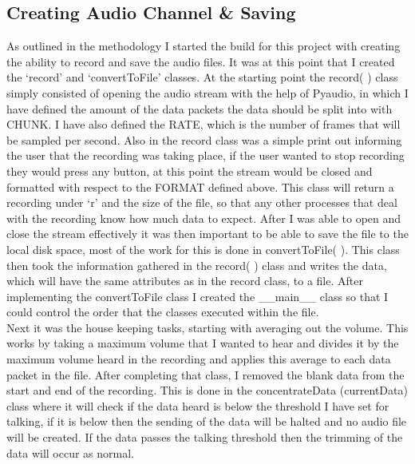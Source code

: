 \documentclass[a4paper,11pt]{report}
\begin{document}
\subsection{Creating Audio Channel \& Saving}
As outlined in the methodology I started the build for this project with creating the ability to record and save the audio files. It was at this point that I created the ‘record’ and ‘convertToFile’ classes. At the starting point the record( ) class simply consisted of opening the audio stream with the help of Pyaudio, in which I have defined the amount of the data packets the data should be split into with CHUNK. I have also defined the RATE, which is the number of frames that will be sampled per second. Also in the record class was a simple print out informing the user that the recording was taking place, if the user wanted to stop recording they would press any button, at this point the stream would be closed and formatted with respect to the FORMAT defined above. This class will return a recording under ‘r’ and the size of the file, so that any other processes that deal with the recording know how much data to expect. After I was able to open and close the stream effectively it was then important to be able to save the file to the local disk space, most of the work for this is done in convertToFile( ). This class then took the information gathered in the record( ) class and writes the data, which will have the same attributes as in the record class, to a file. After implementing the convertToFile class I created the \_\_main\_\_ class so that I could control the order that the classes executed within the file.\\
Next it was the house keeping tasks, starting with averaging out the volume. This works by taking a maximum volume that I wanted to hear and divides it by the maximum volume heard in the recording and applies this average to each data packet in the file. After completing that class, I removed the blank data from the start and end of the recording. This is done in the concentrateData (currentData) class where it will check if the data heard is below the threshold I have set for talking, if it is below then the sending of the data will be halted and no audio file will be created. If the data passes the talking threshold then the trimming of the data will occur as normal.
\end{document}
